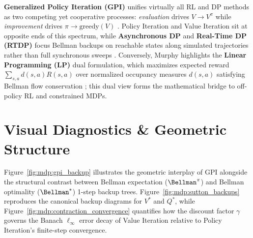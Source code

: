 \documentclass[../../../../master.tex]{subfiles}
\begin{document}
\begin{crossbook}
\textbf{Generalized Policy Iteration (GPI)} unifies virtually all RL and DP methods as two competing yet cooperative processes: \emph{evaluation} drives $V \to V^\pi$ while \emph{improvement} drives $\pi \to \mathrm{greedy}(V)$ . Policy Iteration and Value Iteration sit at opposite ends of this spectrum, while \textbf{Asynchronous DP} and \textbf{Real-Time DP (RTDP)} focus Bellman backups on reachable states along simulated trajectories rather than full synchronous sweeps . Conversely, Murphy highlights the \textbf{Linear Programming (LP)} dual formulation, which maximizes expected reward $\sum_{s,a} d(s,a) R(s,a)$ over normalized occupancy measures $d(s,a)$ satisfying Bellman flow conservation ; this dual view forms the mathematical bridge to off-policy RL and constrained MDPs.
\end{crossbook}

\section{Visual Diagnostics \& Geometric Structure}\label{sec:mdp:visuals}

Figure~\ref{fig:mdp:gpi_backup} illustrates the geometric interplay of GPI alongside the structural contrast between Bellman expectation ($\Bellman^\pi$) and Bellman optimality ($\Bellman^*$) 1-step backup trees. Figure~\ref{fig:mdp:sutton_backups} reproduces the canonical backup diagrams for $V^*$ and $Q^*$, while Figure~\ref{fig:mdp:contraction_convergence} quantifies how the discount factor $\gamma$ governs the Banach $\ell_\infty$ error decay of Value Iteration relative to Policy Iteration's finite-step convergence.
\end{document}
